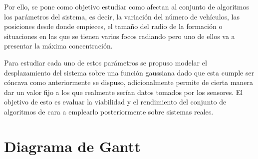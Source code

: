 Por ello, se pone como objetivo estudiar como afectan al conjunto de algoritmos los parámetros del sistema, es decir, la variación del número de vehículos, las posiciones desde donde empieces, el tamaño del radio de la formación o situaciones en las que se tienen varios focos radiando pero uno de ellos va a presentar la máxima concentración.

Para estudiar cada uno de estos parámetros se propuso modelar el desplazamiento del sistema sobre una función gaussiana dado que esta cumple ser cóncava como anteriormente se dispuso, adicionalmente permite de cierta manera dar un valor fijo a los que realmente serían datos tomados por los sensores. El objetivo de esto es evaluar la viabilidad y el rendimiento del conjunto de algoritmos de cara a emplearlo posteriormente sobre sistemas reales.

\section{Diagrama de Gantt}\label{Gantt}

